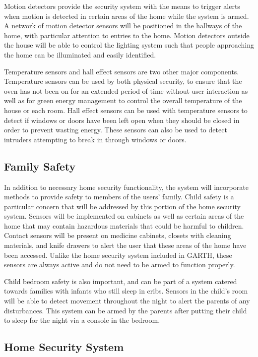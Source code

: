 \documentclass{report}
\begin{document}
Motion detectors provide the security system with the means to trigger alerts 
when motion is detected in certain areas of the home while the system is armed.
A network of motion detector sensors will be positioned in the hallways of the
home, with particular attention to entries to the home. Motion detectors
outside the house will be able to control the lighting system such that people
approaching the home can be illuminated and easily identified.

Temperature sensors and hall effect sensors are two other major components.
Temperature sensors can be used by both physical security, to ensure that the
oven has not been on for an extended period of time without user interaction as
well as for green energy management to control the overall temperature of the
house or each room. Hall effect sensors can be used with temperature sensors to
detect if windows or doors have been left open when they should be closed in
order to prevent wasting energy. These sensors can also be used to detect
intruders attempting to break in through windows or doors.

\subsection{Family Safety}

In addition to necessary home security functionality, the system will
incorporate methods to provide safety to members of the users' family. Child
safety is a particular concern that will be addressed by this portion of the
home security system. Sensors will be implemented on cabinets as well as
certain areas of the home that may contain hazardous materials that could be
harmful to children. Contact sensors will be present on medicine cabinets,
closets with cleaning materials, and knife drawers to alert the user that these
areas of the home have been accessed. Unlike the home security system
included in GARTH, these sensors are always active and do not need to be
armed to function properly. 

Child bedroom safety is also important, and can be part of a system catered 
towards families with infants who still sleep in cribs. Sensors in the child's room 
will be able to detect movement throughout the night to alert the parents of any 
disturbances. This system can be armed by the parents after putting their child
to sleep for the night via a console in the bedroom.

\subsection{Home Security System}
\end{document}
